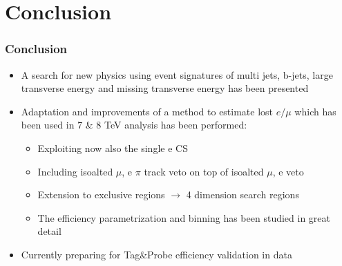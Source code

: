 \documentclass{beamer}
\begin{document}
\section{Conclusion}
\begin{frame}
 \frametitle{Conclusion}
 \begin{itemize}
  \item A search for new physics using event signatures of multi jets, b-jets, large transverse energy and missing transverse energy has been presented
  \item Adaptation and improvements of a method to estimate lost $e/\mu$ which has been used in 7 \& 8 TeV analysis has been performed:
  \begin{itemize}
   \item Exploiting now also the single e CS
   \item Including isoalted $\mu$, e $\pi$ track veto on top of isoalted $\mu$, e veto
   \item Extension to exclusive \BTags regions $\rightarrow$ 4 dimension search regions
   \item The efficiency parametrization and binning has been studied in great detail
  \end{itemize}
  \item Currently preparing for Tag\&Probe efficiency validation in data
  \end{itemize}
%

\end{frame}
\end{document}
